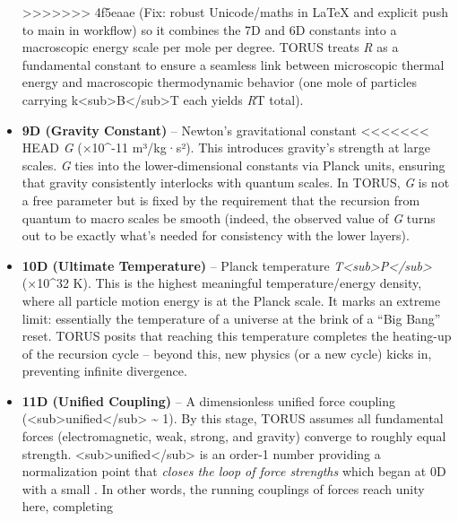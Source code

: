 \documentclass[]{article}
\begin{document}
\begin{itemize}
>>>>>>> 4f5eaae (Fix: robust Unicode/maths in LaTeX and explicit push to main in workflow)
  so it combines the 7D and 6D constants into a macroscopic energy scale
  per mole per degree​. TORUS treats \emph{R} as a fundamental constant
  to ensure a seamless link between microscopic thermal energy and
  macroscopic thermodynamic behavior (one mole of particles carrying
  k\textless{}sub\textgreater{}B\textless{}/sub\textgreater{}T each
  yields \emph{R}T total)​.
\item
  \textbf{9D (Gravity Constant)} -- Newton's gravitational constant
<<<<<<< HEAD
  \emph{G} (×10\^{}-11 m³/kg·s²)\hspace{0pt}. This introduces
  gravity's strength at large scales. \emph{G} ties into the
  lower-dimensional constants via Planck units, ensuring that gravity
  consistently interlocks with quantum scales\hspace{0pt}. In TORUS,
  \emph{G} is not a free parameter but is fixed by the requirement that
  the recursion from quantum to macro scales be smooth (indeed, the
  observed value of \emph{G} turns out to be exactly what's needed for
  consistency with the lower layers)\hspace{0pt}.
\item
  \textbf{10D (Ultimate Temperature)} -- Planck temperature
  \emph{T\textless sub\textgreater P\textless/sub\textgreater{}} (×10\^{}32 K)\hspace{0pt}. This is the highest meaningful
  temperature/energy density, where all particle motion energy is at the
  Planck scale. It marks an extreme limit: essentially the temperature
  of a universe at the brink of a ``Big Bang'' reset. TORUS posits that
  reaching this temperature completes the heating-up of the recursion
  cycle\hspace{0pt} -- beyond this, new physics (or a new cycle) kicks
  in, preventing infinite divergence.
\item
  \textbf{11D (Unified Coupling)} -- A dimensionless unified force
  coupling
  (\alpha\textless sub\textgreater unified\textless/sub\textgreater{}
  \textasciitilde{} 1)\hspace{0pt}. By this stage, TORUS assumes all
  fundamental forces (electromagnetic, weak, strong, and gravity)
  converge to roughly equal strength.
  \alpha\textless sub\textgreater unified\textless/sub\textgreater{} is an
  order-1 number providing a normalization point that \emph{closes the
  loop of force strengths} which began at 0D with a small \alpha. In other
  words, the running couplings of forces reach unity here, completing

\end{itemize}
\end{document}
